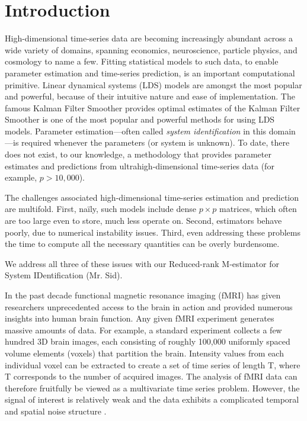 \documentclass[fleqn]{article}
\newcommand{\mrsid}{{\sc \texttt{Mr}.~\texttt{Sid}}}
\begin{document}
\section{Introduction}

High-dimensional time-series data are becoming increasingly abundant across a wide variety of domains, spanning economics, neuroscience,  particle physics, and cosmology to name a few.  
Fitting statistical models to such data, to enable parameter estimation and time-series prediction, is an important computational primitive. 
Linear dynamical systems (LDS) models are amongst the most popular and powerful, because of their intuitive nature and ease of implementation.  The famous Kalman Filter Smoother provides optimal estimates of the 
 Kalman Filter Smoother is one of the most popular and powerful methods for using LDS models.
Parameter estimation---often called \emph{system identification} in this domain---is required whenever the parameters (or system is unknown).  To date, there does not exist, to our knowledge, a methodology that provides parameter estimates and predictions from ultrahigh-dimensional time-series data (for example, $p > 10,000$).

The challenges associated high-dimensional time-series estimation and prediction are multifold.  First, na\"{i}ly, such models include dense $p \times p$ matrices, which often are too large even to store, much less operate on.  Second, estimators behave poorly, due to numerical instability issues.  Third, even addressing these problems the time to compute all the necessary quantities can be overly burdensome.

We address all three of these issues with our Reduced-rank M-estimator for System IDentification (Mr. Sid).


 In the past decade functional magnetic resonance imaging (fMRI) has given researchers unprecedented access to the brain in action and provided numerous insights into human brain function. Any given fMRI experiment generates massive amounts of data. For example, a standard experiment collects a few hundred 3D brain images, each consisting of roughly 100,000 uniformly spaced volume elements (voxels) that partition the brain. Intensity values from each individual voxel can be extracted to create a set of time series of length T, where T corresponds to the number of acquired images. The analysis of fMRI data can therefore fruitfully be viewed as a multivariate time series problem. However, the signal of interest is relatively weak and the data exhibits a complicated temporal and spatial noise structure \cite{lindquist2008statistical}.
\end{document}

